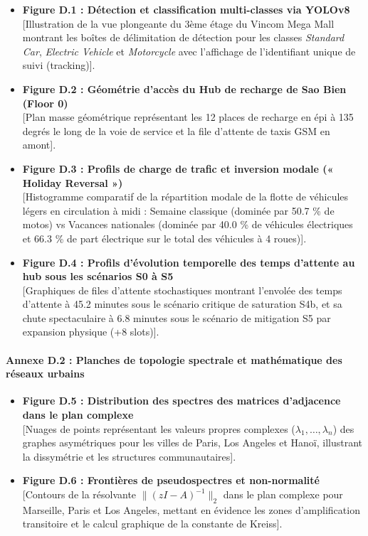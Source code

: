 \documentclass[10pt, a4paper]{article}
\providecommand{\tightlist}{}
\begin{document}
\begin{itemize}
\tightlist
\item
  \textbf{Figure D.1 : Détection et classification multi-classes via
  YOLOv8}\\
  {[}Illustration de la vue plongeante du 3ème étage du Vincom Mega Mall
  montrant les boîtes de délimitation de détection pour les classes
  \emph{Standard Car}, \emph{Electric Vehicle} et \emph{Motorcycle} avec
  l'affichage de l'identifiant unique de suivi (tracking){]}.
\item
  \textbf{Figure D.2 : Géométrie d'accès du Hub de recharge de Sao Bien
  (Floor 0)}\\
  {[}Plan masse géométrique représentant les 12 places de recharge en
  épi à 135 degrés le long de la voie de service et la file d'attente de
  taxis GSM en amont{]}.
\item
  \textbf{Figure D.3 : Profils de charge de trafic et inversion modale
  (« Holiday Reversal »)}\\
  {[}Histogramme comparatif de la répartition modale de la flotte de
  véhicules légers en circulation à midi : Semaine classique (dominée
  par 50.7 \% de motos) vs Vacances nationales (dominée par 40.0 \% de
  véhicules électriques et 66.3 \% de part électrique sur le total des
  véhicules à 4 roues){]}.
\item
  \textbf{Figure D.4 : Profils d'évolution temporelle des temps
  d'attente au hub sous les scénarios S0 à S5}\\
  {[}Graphiques de files d'attente stochastiques montrant l'envolée des
  temps d'attente à 45.2 minutes sous le scénario critique de saturation
  S4b, et sa chute spectaculaire à 6.8 minutes sous le scénario de
  mitigation S5 par expansion physique (+8 slots){]}.
\end{itemize}

\paragraph{Annexe D.2 : Planches de topologie spectrale et mathématique
des réseaux
urbains}\label{annexe-d.2-planches-de-topologie-spectrale-et-mathuxe9matique-des-ruxe9seaux-urbains}

\begin{itemize}
\tightlist
\item
  \textbf{Figure D.5 : Distribution des spectres des matrices
  d'adjacence dans le plan complexe}\\
  {[}Nuages de points représentant les valeurs propres complexes
  (\(\lambda_1, \dots, \lambda_n\)) des graphes asymétriques pour les
  villes de Paris, Los Angeles et Hanoï, illustrant la dissymétrie et
  les structures communautaires{]}.
\item
  \textbf{Figure D.6 : Frontières de pseudospectres et non-normalité}\\
  {[}Contours de la résolvante \(\|(zI - A)^{-1}\|_2\) dans le plan
  complexe pour Marseille, Paris et Los Angeles, mettant en évidence les
  zones d'amplification transitoire et le calcul graphique de la
  constante de Kreiss{]}.
\end{itemize}
\end{document}
